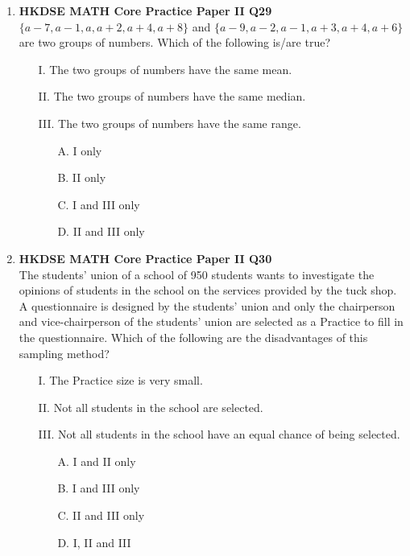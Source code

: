 \documentclass[12pt]{article}
\begin{document}
\begin{enumerate}
	\item \textbf{HKDSE MATH Core Practice Paper II Q29}\\
	$\{ a - 7 , a - 1 , a , a + 2 , a + 4 , a + 8 \}$ and $\{ a - 9 , a - 2 , a - 1 , a  +3 , a + 4 , a + 6 \}$ are two groups of numbers. Which of the following is/are true?
	\begin{enumerate}
		\item[I.] The two groups of numbers have the same mean.
		\item[II.] The two groups of numbers have the same median.
		\item[III.] The two groups of numbers have the same range.
		\item[]
		\begin{enumerate}
			\item[A.] I only
			\item[B.] II only
			\item[C.] I and III only
			\item[D.] II and III only
		\end{enumerate}
	\end{enumerate}
	
	\item \textbf{HKDSE MATH Core Practice Paper II Q30}\\
	The students' union of a school of 950 students wants to investigate the opinions of students in the school on the services provided by the tuck shop. A questionnaire is designed by the students' union and only the chairperson and vice-chairperson of the students' union are selected as a Practice to fill in the questionnaire. Which of the following are the disadvantages of this sampling method?
	\begin{enumerate}
		\item[I.] The Practice size is very small.
		\item[II.] Not all students in the school are selected.
		\item[III.] Not all students in the school have an equal chance of being selected.
		\item[]
		\begin{enumerate}
			\item[A.] I and II only
			\item[B.] I and III only
			\item[C.] II and III only
			\item[D.] I, II and III
		\end{enumerate}
	\end{enumerate}
	

\end{enumerate}
\end{document}
